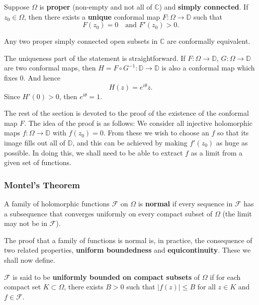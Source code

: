 \documentclass{article}
\begin{document}
\begin{theorem}
Suppose $\Omega$ is \textbf{proper} (non-empty and not all of $\mathbb{C}$) and \textbf{simply connected}. If $z_0 \in \Omega$, then there exists a \textbf{unique} conformal map $F: \Omega \to \mathbb{D}$ such that
$$F(z_0) = 0 \quad \text{and } F'(z_0) > 0.$$
\end{theorem}

\begin{corollary}
Any two proper simply connected open subsets in $\mathbb{C}$ are conformally equivalent.
\end{corollary}

\begin{remark}
The uniqueness part of the statement is straightforward.
If $F: \Omega \to \mathbb{D}$, $G: \Omega \to \mathbb{D}$ are two conformal maps, then $H = F \circ G^{-1}: \mathbb{D} \to \mathbb{D}$ is also a conformal map which fixes $0$. And hence
$$H(z) = e^{i\theta} z.$$
Since $H'(0) > 0$, then $e^{i\theta} = 1$.
\end{remark}

The rest of the section is devoted to the proof of the existence of the conformal map $F$. The idea of the proof is as follows:
We consider all injective holomorphic maps $f: \Omega \to \mathbb{D}$ with $f(z_0) = 0$.
From these we wish to choose an $f$ so that its image fills out all of $\mathbb{D}$, and this can be achieved by making $f'(z_0)$ as huge as possible. In doing this, we shall need to be able to extract $f$ as a limit from a given set of functions.

\subsubsection*{Montel's Theorem}

\begin{definition}
A family of holomorphic functions $\mathcal{F}$ on $\Omega$ is \textbf{normal} if every sequence in $\mathcal{F}$ has a subsequence that converges uniformly on every compact subset of $\Omega$ (the limit may not be in $\mathcal{F}$).
\end{definition}

The proof that a family of functions is normal is, in practice, the consequence of two related properties, \textbf{uniform boundedness} and \textbf{equicontinuity}. These we shall now define.

\begin{definition}
$\mathcal{F}$ is said to be \textbf{uniformly bounded on compact subsets} of $\Omega$ if for each compact set $K \subset \Omega$, there exists $B > 0$ such that $|f(z)| \le B$ for all $z \in K$ and $f \in \mathcal{F}$.
\end{definition}
\end{document}
